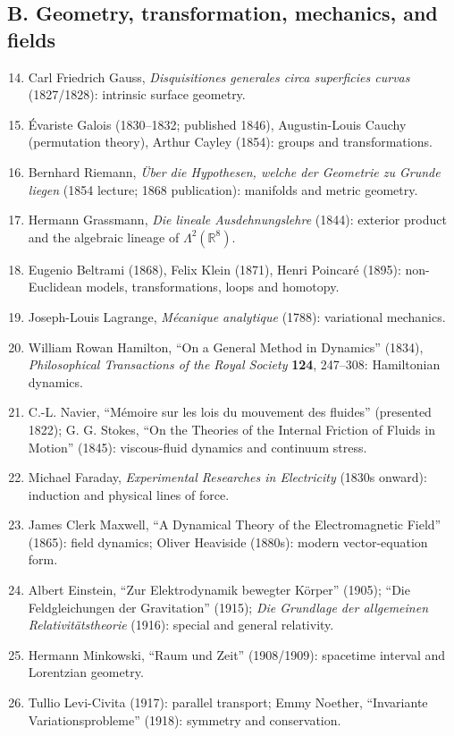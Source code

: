 \documentclass[10pt]{article}
\newcommand{\R}{\mathbb R}
\begin{document}
\subsection*{B. Geometry, transformation, mechanics, and fields}
\begin{enumerate}[itemsep=1pt,topsep=3pt]\setcounter{enumi}{13}
\item Carl Friedrich Gauss, \emph{Disquisitiones generales circa superficies curvas} (1827/1828): intrinsic surface geometry.
\item \'Evariste Galois (1830--1832; published 1846), Augustin-Louis Cauchy (permutation theory), Arthur Cayley (1854): groups and transformations.
\item Bernhard Riemann, \emph{\"Uber die Hypothesen, welche der Geometrie zu Grunde liegen} (1854 lecture; 1868 publication): manifolds and metric geometry.
\item Hermann Grassmann, \emph{Die lineale Ausdehnungslehre} (1844): exterior product and the algebraic lineage of $\Lambda^2(\R^8)$.
\item Eugenio Beltrami (1868), Felix Klein (1871), Henri Poincar\'e (1895): non-Euclidean models, transformations, loops and homotopy.
\item Joseph-Louis Lagrange, \emph{M\'ecanique analytique} (1788): variational mechanics.
\item William Rowan Hamilton, ``On a General Method in Dynamics'' (1834), \emph{Philosophical Transactions of the Royal Society} \textbf{124}, 247--308: Hamiltonian dynamics.
\item C.-L. Navier, ``M\'emoire sur les lois du mouvement des fluides'' (presented 1822); G. G. Stokes, ``On the Theories of the Internal Friction of Fluids in Motion'' (1845): viscous-fluid dynamics and continuum stress.
\item Michael Faraday, \emph{Experimental Researches in Electricity} (1830s onward): induction and physical lines of force.
\item James Clerk Maxwell, ``A Dynamical Theory of the Electromagnetic Field'' (1865): field dynamics; Oliver Heaviside (1880s): modern vector-equation form.
\item Albert Einstein, ``Zur Elektrodynamik bewegter K\"orper'' (1905); ``Die Feldgleichungen der Gravitation'' (1915); \emph{Die Grundlage der allgemeinen Relativit\"atstheorie} (1916): special and general relativity.
\item Hermann Minkowski, ``Raum und Zeit'' (1908/1909): spacetime interval and Lorentzian geometry.
\item Tullio Levi-Civita (1917): parallel transport; Emmy Noether, ``Invariante Variationsprobleme'' (1918): symmetry and conservation.

\end{enumerate}
\end{document}
